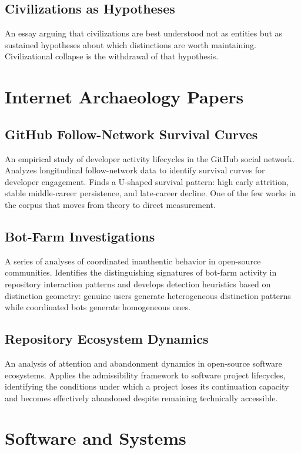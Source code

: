 \documentclass[12pt, openany]{book}
\begin{document}
\subsection{Civilizations as Hypotheses} An essay arguing that civilizations
are best understood not as entities but as sustained hypotheses about which
distinctions are worth maintaining. Civilizational collapse is the
withdrawal of that hypothesis.

\section{Internet Archaeology Papers}

\subsection{GitHub Follow-Network Survival Curves} An empirical study of
developer activity lifecycles in the GitHub social network. Analyzes
longitudinal follow-network data to identify survival curves for developer
engagement. Finds a U-shaped survival pattern: high early attrition,
stable middle-career persistence, and late-career decline. One of the
few works in the corpus that moves from theory to direct measurement.

\subsection{Bot-Farm Investigations} A series of analyses of coordinated
inauthentic behavior in open-source communities. Identifies the
distinguishing signatures of bot-farm activity in repository interaction
patterns and develops detection heuristics based on distinction geometry:
genuine users generate heterogeneous distinction patterns while coordinated
bots generate homogeneous ones.

\subsection{Repository Ecosystem Dynamics} An analysis of attention and
abandonment dynamics in open-source software ecosystems. Applies the
admissibility framework to software project lifecycles, identifying
the conditions under which a project loses its continuation capacity
and becomes effectively abandoned despite remaining technically accessible.

\section{Software and Systems}
\end{document}
